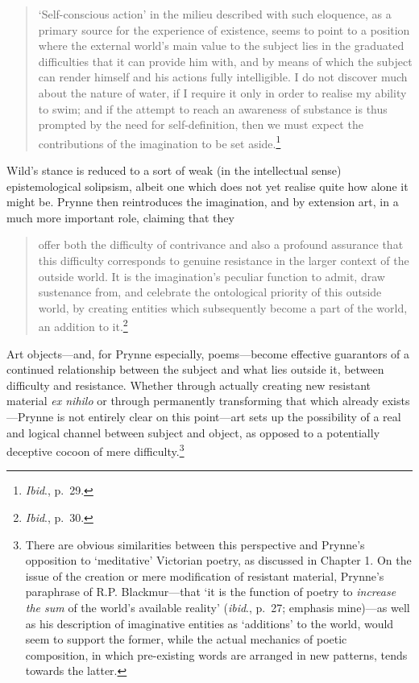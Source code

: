 \documentclass[]{article}
\begin{document}
\begin{quote}
`Self-conscious action' in the milieu described with such eloquence, as
a primary source for the experience of existence, seems to point to a
position where the external world's main value to the subject lies in
the graduated difficulties that it can provide him with, and by means of
which the subject can render himself and his actions fully intelligible.
I do not discover much about the nature of water, if I require it only
in order to realise my ability to swim; and if the attempt to reach an
awareness of substance is thus prompted by the need for self-definition,
then we must expect the contributions of the imagination to be set
aside.\footnote{\emph{Ibid}., p.~29.}
\end{quote}

\noindent Wild's stance is reduced to a sort of weak (in the
intellectual sense) epistemological solipsism, albeit one which does not
yet realise quite how alone it might be. Prynne then reintroduces the
imagination, and by extension art, in a much more important role,
claiming that they

\begin{quote}
offer both the difficulty of contrivance and also a profound assurance
that this difficulty corresponds to genuine resistance in the larger
context of the outside world. It is the imagination's peculiar function
to admit, draw sustenance from, and celebrate the ontological priority
of this outside world, by creating entities which subsequently become a
part of the world, an addition to it.\footnote{\emph{Ibid}., p.~30.}
\end{quote}

\noindent Art objects---and, for Prynne especially, poems---become
effective guarantors of a continued relationship between the subject and
what lies outside it, between difficulty and resistance. Whether through
actually creating new resistant material \emph{ex nihilo} or through
permanently transforming that which already exists---Prynne is not
entirely clear on this point---art sets up the possibility of a real and
logical channel between subject and object, as opposed to a potentially
deceptive cocoon of mere difficulty.\footnote{There are obvious
  similarities between this perspective and Prynne's opposition to
  `meditative' Victorian poetry, as discussed in Chapter 1. On the issue
  of the creation or mere modification of resistant material, Prynne's
  paraphrase of R.P. Blackmur---that `it is the function of poetry to
  \emph{increase the sum} of the world's available reality'
  (\emph{ibid}., p.~27; emphasis mine)---as well as his description of
  imaginative entities as `additions' to the world, would seem to
  support the former, while the actual mechanics of poetic composition,
  in which pre-existing words are arranged in new patterns, tends
  towards the latter.}
\end{document}
